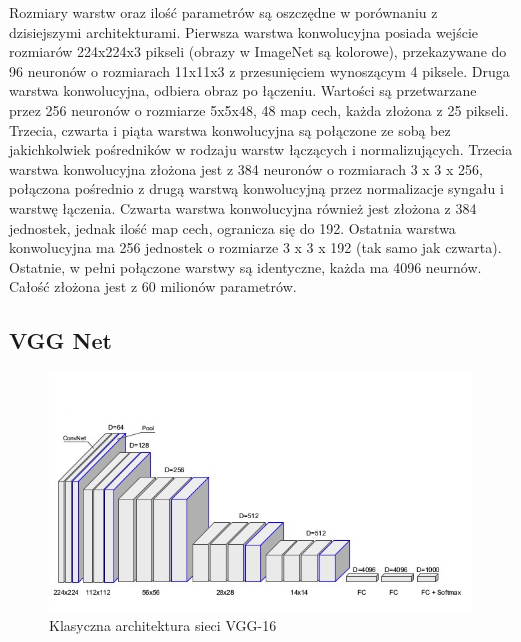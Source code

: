 \documentclass[12pt,a4paper,twoside,titlepage,openright]{book}
\begin{document}
Rozmiary warstw oraz ilość parametrów są oszczędne w porównaniu z dzisiejszymi architekturami. Pierwsza warstwa konwolucyjna posiada wejście rozmiarów 224x224x3 pikseli (obrazy w ImageNet są kolorowe), przekazywane do 96 neuronów o rozmiarach 11x11x3 z przesunięciem wynoszącym 4 piksele. Druga warstwa konwolucyjna, odbiera obraz po łączeniu. Wartości są przetwarzane przez 256 neuronów o rozmiarze 5x5x48, 48 map cech, każda złożona z 25 pikseli. Trzecia, czwarta i piąta warstwa konwolucyjna są połączone ze sobą bez jakichkolwiek pośredników w rodzaju warstw łączących i normalizujących. Trzecia warstwa konwolucyjna złożona jest z 384 neuronów o rozmiarach 3 x 3 x 256, połączona pośrednio z drugą warstwą konwolucyjną przez normalizacje syngału i warstwę łączenia. Czwarta warstwa konwolucyjna również jest złożona z 384 jednostek, jednak ilość map cech, ogranicza się do 192. Ostatnia warstwa konwolucyjna ma 256 jednostek o rozmiarze 3 x 3 x 192 (tak samo jak czwarta). Ostatnie, w pełni połączone warstwy są identyczne, każda ma 4096 neurnów. Całość złożona jest z 60 milionów parametrów. \cite{NIPS2012_4824}

\subsection{VGG Net}
\begin{figure}[ht]
	\centering
			\includegraphics[resolution=100, scale=0.8]{VGGarchitecture.png}
		\caption{Klasyczna architektura sieci VGG-16}
\end{figure}
\end{document}
